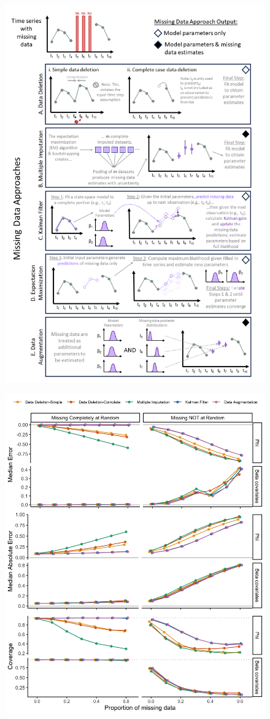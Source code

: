 \documentclass[12pt,english]{article} %
\begin{document}
\begin{linenumbers}
\begin{spacing}{1.9}
\begin{flushleft}
\begin{figure}[h]
     \noindent\includegraphics[width = .7\textwidth]{Figures/ConceptualFigure.png}
     \caption{}
     \label{fig:ConceptualFigure}
 \end{figure}

\begin{figure}
    \noindent\includegraphics[width = .7\textwidth]{Figures/MockedUpFigures/parameterRecoveryGaussian_MARMNARlong.png}
    \caption{} 


\end{figure}
\end{flushleft}
\end{spacing}
\end{linenumbers}
\end{document}
